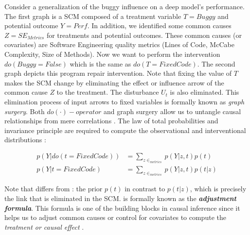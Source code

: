 \begin{exmp} 
\label{exmp:scm}
Consider  a generalization of the buggy influence on a deep model's performance. The first graph is a SCM composed of a treatment variable $T=Buggy$ and potential outcome $Y=Perf$. In addition, we identified some common causes $Z=SE_{Metrics}$ for treatments and potential outcomes. These common causes (or covariates) are Software Engineering quality metrics (\eg Lines of Code, McCabe Complexity, Size of Methods). Now we want to perform the intervention $do(Buggy=False)$ which is the same as $do(T=FixedCode)$. The second graph depicts this program repair intervention. Note that fixing the value of $T$ makes the SCM change by eliminating the effect or influence arrow of the common cause $Z$ to the treatment. The disturbance $U_t$ is also eliminated. This elimination process of input arrows to fixed variables is formally known as \textit{graph surgery}. Both $do(\cdot)-operator$ and graph surgery allow us to untangle causal relationships from mere correlations \citep{Pearl2009Causality}. The law of total probabilities and invariance principle are required to compute the observational and interventional distributions \citep{Scholkopf2022}:
\end{exmp}

\begin{subequations}
\begin{align}
p(Y|do(t=FixedCode)) &=\sum_{z \in _{metrics}}p(Y|z,t)p(t)\label{eqn:do-1} \\
p(Y|t=FixedCode) &= \sum_{z \in _{metrics}}p(Y|z,t)p(t|z) \label{eqn:do-2} 
\end{align}
\label{eqn:do-all-lines}
\end{subequations}

Note that  differs from  : the prior $p(t)$ in contrast to $p(t|z)$, which is precisely the link that is eliminated in the SCM.  is formally known as the \textbf{\textit{adjustment formula}}. This formula is one of the building blocks in causal inference since it helps us to adjust common causes or control for covariates to compute the \textit{treatment or causal effect} \citep{Pearl2009Causality,Pearl2016Causality}.


